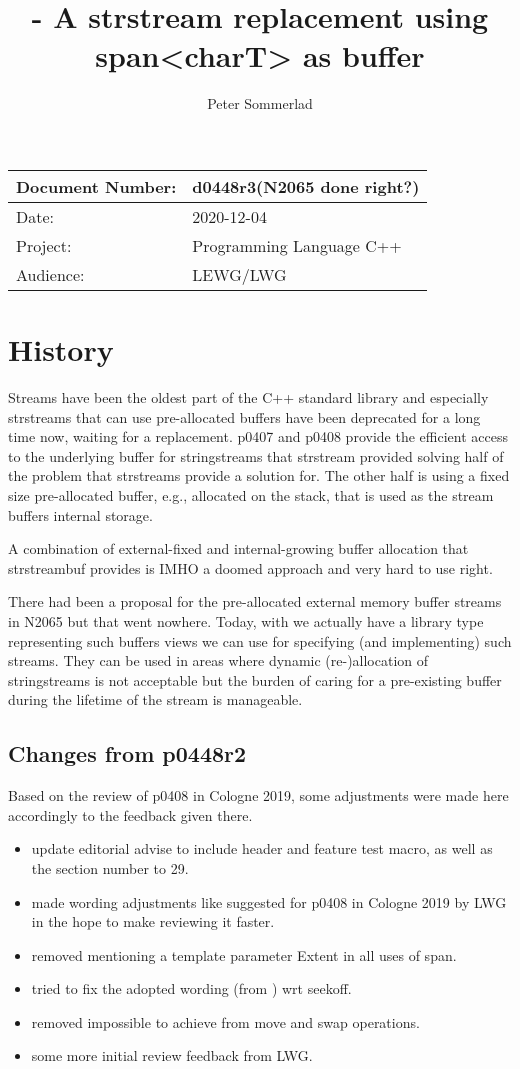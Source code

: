 \documentclass[ebook,11pt,article]{memoir}
\title{\papernumber{} - A strstream replacement using span\textless{}charT\textgreater{} as buffer}
\author{Peter Sommerlad}
\date{\paperdate}                %
\newcommand{\papernumber}{d0448r3}
\newcommand{\paperdate}{2020-12-04}
\begin{document}
\maketitle
\begin{center}
\begin{tabular}[t]{|l|l|}\hline 
Document Number:&  \papernumber \hfill (N2065 done right?)\\\hline
Date: & \paperdate \\\hline
Project: & Programming Language C++\\\hline 
Audience: & LEWG/LWG\\\hline
\end{tabular}
\end{center}
\chapter{History}
Streams have been the oldest part of the C++ standard library and especially strstreams that can use pre-allocated buffers have been deprecated for a long time now, waiting for a replacement. p0407 and p0408 provide the efficient access to the underlying buffer for stringstreams that strstream provided solving half of the problem that strstreams provide a solution for. The other half is using a fixed size pre-allocated buffer, e.g., allocated on the stack, that is used as the stream buffers internal storage.

A combination of external-fixed and internal-growing buffer allocation that strstreambuf provides is IMHO a doomed approach and very hard to use right.

There had been a proposal for the pre-allocated external memory buffer streams in N2065 but that went nowhere. Today, with  we actually have a library type representing such buffers views we can use for specifying (and implementing) such streams. They can be used in areas where dynamic (re-)allocation of stringstreams is not acceptable but the burden of caring for a pre-existing buffer during the lifetime of the stream is manageable. 

\section{Changes from p0448r2}
Based on the review of p0408 in Cologne 2019, some adjustments were made here accordingly to the feedback given there.
\begin{itemize}
\item update editorial advise to include header and feature test macro, as well as the section number to 29.
\item made wording adjustments like suggested for p0408 in Cologne 2019 by LWG in the hope to make reviewing it faster.
\item removed mentioning a template parameter Extent in all uses of span.
\item tried to fix the adopted wording (from ) wrt seekoff.
\item removed impossible to achieve  from move and swap operations.
\item some more initial review feedback from LWG.
\end{itemize}
\end{document}
